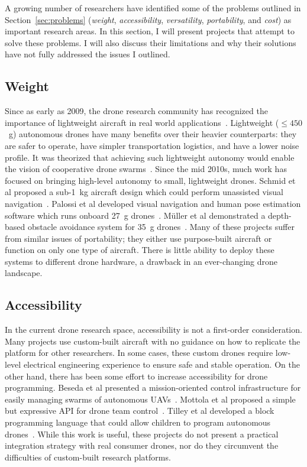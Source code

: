 A growing number of researchers have identified some of the problems outlined in Section~\ref{sec:problems} (\textit{weight}, \textit{accessibility}, \textit{versatility}, \textit{portability}, and \textit{cost}) as important research areas. In this section, I will present projects that attempt to solve these problems. I will also discuss their limitations and why their solutions have not fully addressed the issues I outlined.


\subsection{Weight}
Since as early as 2009, the drone research community has recognized the importance of lightweight aircraft in real world applications~\cite{Burkle2011, Burkle2009}. Lightweight ($\leq 450$~g) autonomous drones have many benefits over their heavier counterparts: they are safer to operate, have simpler transportation logistics, and have a lower noise profile. It was theorized that achieving such lightweight autonomy would enable the vision of cooperative drone swarms~\cite{Floreano2015}. Since the mid 2010s, much work has focused on bringing high-level autonomy to small, lightweight drones. Schmid et al proposed a sub-1~kg aircraft design which could perform unassisted visual navigation~\cite{Schmid2014}. Palossi et al developed visual navigation and human pose estimation software which runs onboard 27~g drones~\cite{Palossi2019,Palossi2021}. M{\"u}ller et al demonstrated a depth-based obstacle avoidance system for 35~g drones~\cite{Muller2023}. Many of these projects suffer from similar issues of portability; they either use purpose-built aircraft or function on only one type of aircraft. There is little ability to deploy these systems to different drone hardware, a drawback in an ever-changing drone landscape. 

\subsection{Accessibility}
\label{sec:development-platforms}
In the current drone research space, accessibility is not a first-order consideration. Many projects use custom-built aircraft with no guidance on how to replicate the platform for other researchers. In some cases, these custom drones require low-level electrical engineering experience to ensure safe and stable operation. On the other hand, there has been some effort to increase accessibility for drone programming. Beseda et al presented a mission-oriented control infrastructure for easily managing swarms of autonomous UAVs~\cite{Besada2019}. Mottola et al proposed a simple but expressive API for drone team control~\cite{Mottola2014}. Tilley et al developed a block programming language that could allow children to program autonomous drones~\cite{Tilley2017}. While this work is useful, these projects do not present a practical integration strategy with real consumer drones, nor do they circumvent the difficulties of custom-built research platforms.

